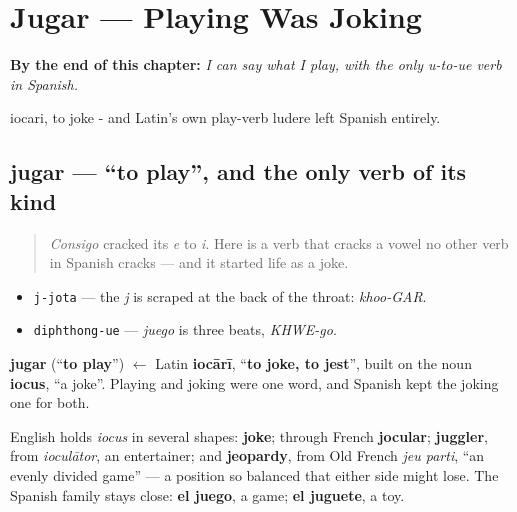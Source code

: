 
\chapter{Jugar --- Playing Was Joking}
\label{ch:spanish-jugar}

\begin{chapteropening}
\textbf{By the end of this chapter:} \emph{I can say what I play, with the only u-to-ue verb in Spanish.}

iocari, to joke - and Latin's own play-verb ludere left Spanish entirely.
\end{chapteropening}

\section[jugar]{jugar — \textquotedblleft{}to play\textquotedblright{}, and the only verb of its kind}

\label{lesson:ES-C39-jugar}



\begin{quote}
\emph{Consigo} cracked its \emph{e} to \emph{i}. Here is a verb that cracks a vowel no other verb in Spanish cracks — and it started life as a joke.
\end{quote}

\begin{sounds}
\begin{itemize}
\raggedright
  \item \texttt{j-jota} — the \emph{j} is scraped at the back of the throat: \emph{khoo-GAR}.
  \item \texttt{diphthong-ue} — \emph{juego} is three beats, \emph{KHWE-go}.
\end{itemize}
\end{sounds}

\begin{cousinweb}
\textbf{jugar} (\textquotedblleft{}\textbf{to play}\textquotedblright{}) $\leftarrow$ Latin \textbf{iocārī}, \textquotedblleft{}\textbf{to joke, to jest}\textquotedblright{}, built on the noun \textbf{iocus}, \textquotedblleft{}a joke\textquotedblright{}. Playing and joking were one word, and Spanish kept the joking one for both.

English holds \emph{iocus} in several shapes: \textbf{joke}; through French \textbf{jocular}; \textbf{juggler}, from \emph{ioculātor}, an entertainer; and \textbf{jeopardy}, from Old French \emph{jeu parti}, \textquotedblleft{}an evenly divided game\textquotedblright{} — a position so balanced that either side might lose. The Spanish family stays close: \textbf{el juego}, a game; \textbf{el juguete}, a toy.
\end{cousinweb}

